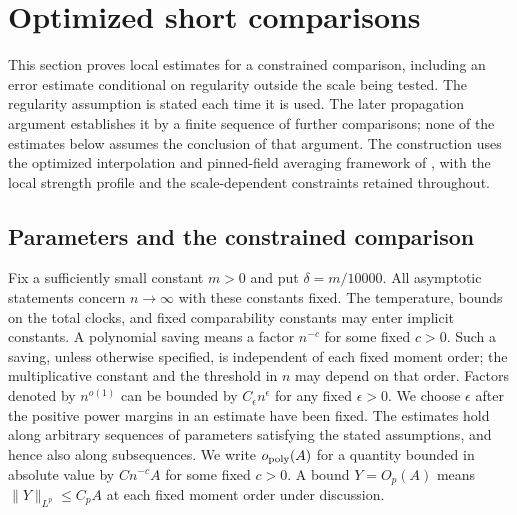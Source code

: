 \section{Optimized short comparisons}\label{sec:comparisons}

This section proves local estimates for a constrained comparison, including
an error estimate conditional on regularity outside the scale being tested.
The regularity assumption is stated each time it is used.  The later
propagation argument establishes it by a finite sequence of further
comparisons; none of the estimates below assumes the conclusion of that
argument.
The construction uses the optimized interpolation and pinned-field
averaging framework of \cite[Proposition~2.3 and Section~3]{AL2026}, with
the local strength profile and the scale-dependent constraints retained
throughout.

\subsection{Parameters and the constrained comparison}

Fix a sufficiently small constant $m>0$ and put $\delta=m/10000$.
All asymptotic statements concern $n\to\infty$ with these constants fixed.
The temperature, bounds on the total clocks, and fixed comparability
constants may enter implicit constants.  A polynomial saving means a
factor $n^{-c}$ for some fixed $c>0$.  Such a saving, unless otherwise
specified, is independent of each fixed moment order; the multiplicative
constant and the threshold in $n$ may depend on that order.  Factors denoted
by $n^{o(1)}$ can be bounded by $C_\epsilon n^\epsilon$ for any fixed
$\epsilon>0$.  We choose $\epsilon$ after the positive power margins in an
estimate have been fixed.  The estimates hold along arbitrary sequences
of parameters satisfying the stated assumptions, and hence also along
subsequences. We write $o_{\rm poly}(A)$ for a quantity bounded in
absolute value by $Cn^{-c}A$ for some fixed $c>0$. A bound $Y=O_p(A)$
means $\|Y\|_{L^p}\le C_pA$ at each fixed moment order under discussion.

